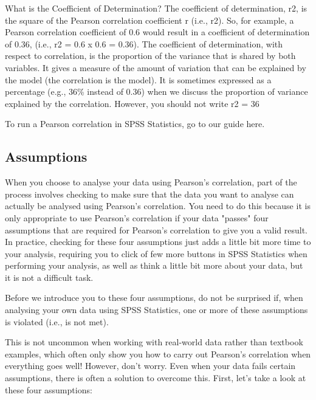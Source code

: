 \documentclass[]{article}
\begin{document}
What is the Coefficient of Determination?
The coefficient of determination, r2, is the square of the Pearson correlation coefficient r (i.e., r2). So, for example, a Pearson correlation coefficient of 0.6 would result in a coefficient of determination of 0.36, (i.e., r2 = 0.6 x 0.6 = 0.36). The coefficient of determination, with respect to correlation, is the proportion of the variance that is shared by both variables. It gives a measure of the amount of variation that can be explained by the model (the correlation is the model). It is sometimes expressed as a percentage (e.g., 36\% instead of 0.36) when we discuss the proportion of variance explained by the correlation. However, you should not write r2 = 36%

To run a Pearson correlation in SPSS Statistics, go to our guide here.



\subsection{Assumptions}
When you choose to analyse your data using Pearson’s correlation, part of the process involves checking to make sure that the data you want to analyse can actually be analysed using Pearson’s correlation. You need to do this because it is only appropriate to use Pearson’s correlation if your data "passes" four assumptions that are required for Pearson’s correlation to give you a valid result. In practice, checking for these four assumptions just adds a little bit more time to your analysis, requiring you to click of few more buttons in SPSS Statistics when performing your analysis, as well as think a little bit more about your data, but it is not a difficult task.

Before we introduce you to these four assumptions, do not be surprised if, when analysing your own data using SPSS Statistics, one or more of these assumptions is violated (i.e., is not met). 

This is not uncommon when working with real-world data rather than textbook examples, which often only show you how to carry out Pearson’s correlation when everything goes well! However, don’t worry. Even when your data fails certain assumptions, there is often a solution to overcome this. First, let’s take a look at these four assumptions:
\end{document}
